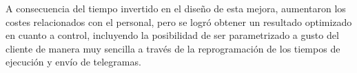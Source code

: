 A consecuencia del tiempo invertido en el diseño de esta mejora, aumentaron los costes relacionados con el personal, pero se logró obtener un resultado optimizado en cuanto a control, incluyendo la posibilidad de ser parametrizado a gusto del cliente de manera muy sencilla a través de la reprogramación de los tiempos de ejecución y envío de telegramas.

